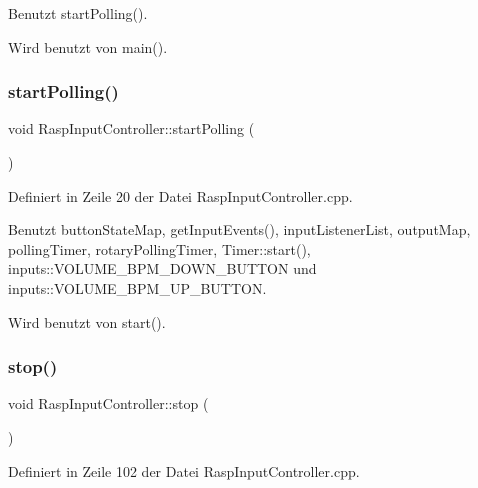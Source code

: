 Benutzt start\+Polling().



Wird benutzt von main().

\mbox{\label{class_rasp_input_controller_a7e15590d321b382fcb5f4d70959a5cbe}} 
\subsubsection{\texorpdfstring{start\+Polling()}{startPolling()}}
{\footnotesize\ttfamily void Rasp\+Input\+Controller\+::start\+Polling (\begin{DoxyParamCaption}{ }\end{DoxyParamCaption})\hspace{0.3cm}{\ttfamily [private]}}



Definiert in Zeile 20 der Datei Rasp\+Input\+Controller.\+cpp.



Benutzt button\+State\+Map, get\+Input\+Events(), input\+Listener\+List, output\+Map, polling\+Timer, rotary\+Polling\+Timer, Timer\+::start(), inputs\+::\+V\+O\+L\+U\+M\+E\+\_\+\+B\+P\+M\+\_\+\+D\+O\+W\+N\+\_\+\+B\+U\+T\+T\+ON und inputs\+::\+V\+O\+L\+U\+M\+E\+\_\+\+B\+P\+M\+\_\+\+U\+P\+\_\+\+B\+U\+T\+T\+ON.



Wird benutzt von start().

\mbox{\label{class_rasp_input_controller_a7d9523be1a83acde964cb5d2b1d281ed}} 
\subsubsection{\texorpdfstring{stop()}{stop()}}
{\footnotesize\ttfamily void Rasp\+Input\+Controller\+::stop (\begin{DoxyParamCaption}{ }\end{DoxyParamCaption})}



Definiert in Zeile 102 der Datei Rasp\+Input\+Controller.\+cpp.



